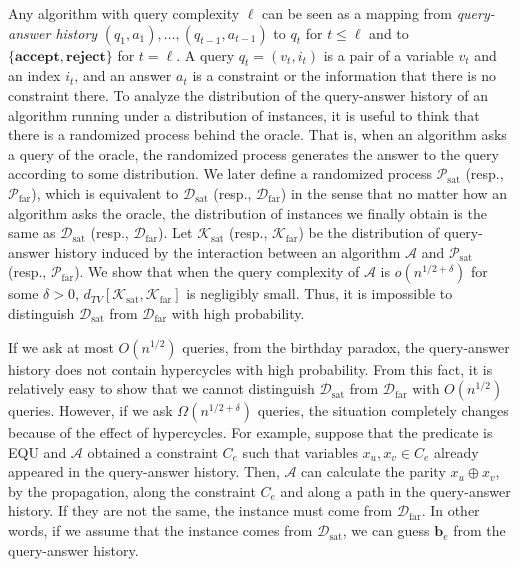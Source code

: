 \documentclass[letterpaper,11pt]{article}
\newcommand{\dtv}{d_{TV}}
\newcommand{\calpsat}{\mathcal{P}_{\mathrm{sat}}}
\newcommand{\calpfar}{\mathcal{P}_{\mathrm{far}}}
\newcommand{\caldsat}{\mathcal{D}_{\mathrm{sat}}}
\newcommand{\caldfar}{\mathcal{D}_{\mathrm{far}}}
\newcommand{\calksat}{\mathcal{K}_{\mathrm{sat}}}
\newcommand{\calkfar}{\mathcal{K}_{\mathrm{far}}}
\newcommand{\cala}{\mathcal{A}}
\newcommand{\bfb}{\mathbf{b}}
\newcommand{\equ}{\textsf{EQU}\xspace}
\begin{document}
Any algorithm with query complexity $\ell$ can be seen as a mapping from \textit{query-answer history} $(q_1,a_1),\ldots,(q_{t-1},a_{t-1})$ to $q_{t}$ for $t\leq \ell$ and to $\{\mathbf{accept},\mathbf{reject}\}$ for $t=\ell$.
A query $q_t=(v_t,i_t)$ is a pair of a variable $v_t$ and an index $i_t$, and an answer $a_t$ is a constraint or the information that there is no constraint there.
To analyze the distribution of the query-answer history of an algorithm running under a distribution of instances,
it is useful to think that there is a randomized process behind the oracle.
That is, when an algorithm asks a query of the oracle, 
the randomized process generates the answer to the query according to some distribution.
We later define a randomized process $\calpsat$ (resp., $\calpfar$),
which is equivalent to $\caldsat$ (resp., $\caldfar$) in the sense that no matter how an algorithm asks the oracle,
the distribution of instances we finally obtain is the same as $\caldsat$ (resp., $\caldfar$).
Let $\calksat$ (resp., $\calkfar$) be the distribution of query-answer history induced by the interaction between an algorithm $\cala$ and $\calpsat$ (resp., $\calpfar$).
We show that when the query complexity of $\cala$ is $o(n^{1/2+\delta})$ for some $\delta>0$,
$\dtv[\calksat,\calkfar]$ is negligibly small.
Thus, it is impossible to distinguish $\caldsat$ from $\caldfar$ with high probability.

If we ask at most $O(n^{1/2})$ queries, 
from the birthday paradox,
the query-answer history does not contain hypercycles with high probability.
From this fact, it is relatively easy to show that we cannot distinguish $\caldsat$ from $\caldfar$ with $O(n^{1/2})$ queries.
However, if we ask $\Omega(n^{1/2+\delta})$ queries,
the situation completely changes because of the effect of hypercycles.
For example, suppose that the predicate is \equ and $\cala$ obtained a constraint $C_e$ such that variables $x_u,x_v\in C_e$ already appeared in the query-answer history.
Then, $\cala$ can calculate the parity $x_u\oplus x_v$, by the propagation, along the constraint $C_e$ and along a path in the query-answer history.
If they are not the same, the instance must come from $\caldfar$.
In other words, if we assume that the instance comes from $\caldsat$,  
we can guess $\bfb_e$ from the query-answer history.
\end{document}
